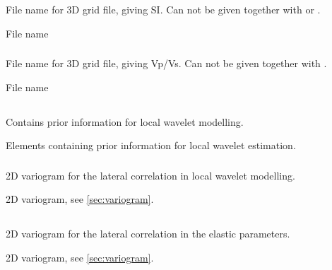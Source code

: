 \subsubsection{}
 \slist
   \item \Description File name for 3D grid file, giving SI. Can not
   be given together with  or .
   \item \Argument File name
   \item \Default
 \elist

\subsubsection{}
 \slist
   \item \Description File name for 3D grid file, giving Vp/Vs. Can
   not be given together with .
   \item \Argument File name
   \item \Default
 \elist

\subsection{}
 \slist
   \item \Description Contains prior information for local wavelet modelling.
   \item \Argument Elements containing prior information for local wavelet estimation.
   \item \Default
 \elist

\subsubsection{}
 \slist
   \item \Description 2D variogram for the lateral correlation in local wavelet  modelling.
   \item \Argument 2D variogram, see \autoref{sec:variogram}.
   \item \Default
 \elist

\subsection{}
 \slist
   \item \Description 2D variogram for the lateral correlation in the elastic parameters.
   \item \Argument 2D variogram, see \autoref{sec:variogram}.
   \item \Default
 \elist


